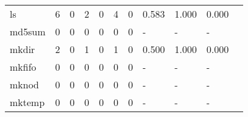 \begin{longtable}{lp{1.2cm}p{1.2cm}p{1.2cm}p{1.2cm}p{1.2cm}p{1.2cm}p{1.2cm}p{1.2cm}p{1.2cm}p{1.2cm}}
ls        &                                     6 &                                                  0 &                                                  2 &                                                  0 &                                                  4 &                                                  0 &                                              0.583 &                                              1.000 &                                              0.000 \\
md5sum    &                                     0 &                                                  0 &                                                  0 &                                                  0 &                                                  0 &                                                  0 &                                                  - &                                                  - &                                                  - \\
mkdir     &                                     2 &                                                  0 &                                                  1 &                                                  0 &                                                  1 &                                                  0 &                                              0.500 &                                              1.000 &                                              0.000 \\
mkfifo    &                                     0 &                                                  0 &                                                  0 &                                                  0 &                                                  0 &                                                  0 &                                                  - &                                                  - &                                                  - \\
mknod     &                                     0 &                                                  0 &                                                  0 &                                                  0 &                                                  0 &                                                  0 &                                                  - &                                                  - &                                                  - \\
mktemp    &                                     0 &                                                  0 &                                                  0 &                                                  0 &                                                  0 &                                                  0 &                                                  - &                                                  - &                                                  - \\

\end{longtable}
